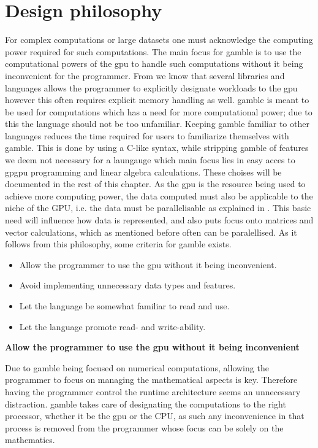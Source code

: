 \section{Design philosophy}
For complex computations or large datasets one must acknowledge the computing power required for such computations.
The main focus for \gls{gamble} is to use the computational powers of the \acrshort{gpu} to handle such computations without it being inconvenient for the programmer.
From  we know that several libraries and languages allows the programmer to explicitly designate workloads to the \acrshort{gpu} however this often requires explicit memory handling as well.
\gls{gamble} is meant to be used for computations which has a need for more computational power; due to this the language should not be too unfamiliar.
Keeping \gls{gamble} familiar to other languages reduces the time required for users to familiarize themselves with \gls{gamble}.
This is done by using a C-like syntax, while stripping \gls{gamble} of features we deem not necessary for a laungauge which main focus lies in easy acces to \acrshort{gpgpu} programming and linear algebra calculations.
These choises will be documented in the rest of this chapter.
As the \acrshort{gpu} is the resource being used to achieve more computing power, the data computed must also be applicable to the niche of the GPU, i.e. the data must be parallelisable as explained in .
This basic need will influence how data is represented, and also puts focus onto matrices and vector calculations, which as mentioned before often can be paralellised.
As it follows from this philosophy, some criteria for \gls{gamble} exists.
\begin{itemize}
	\item Allow the programmer to use the \acrshort{gpu} without it being inconvenient.
	\item Avoid implementing unnecessary data types and features.
	\item Let the language be somewhat familiar to read and use.
	\item Let the language promote read- and write-ability.
\end{itemize}

\textbf{Allow the programmer to use the \acrshort{gpu} without it being inconvenient}

Due to \gls{gamble} being focused on numerical computations, allowing the programmer to focus on managing the mathematical aspects is key.
Therefore having the programmer control the runtime architecture seems an unnecessary distraction.
\gls{gamble} takes care of designating the computations to the right processor, whether it be the \acrshort{gpu} or the CPU, as such any inconvenience in that process is removed from the programmer whose focus can be solely on the mathematics.

